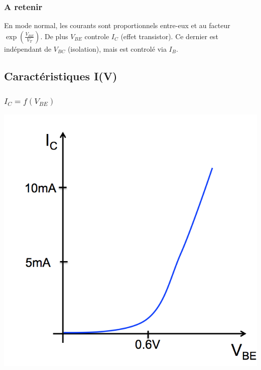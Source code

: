 \documentclass[]{article}
\begin{document}
\subsubsection{A retenir}
En mode normal, les courants sont proportionnels entre-eux et au facteur $\exp{(\frac{V_{BE}}{V_T})}$. De plus $V_{BE}$ controle $I_C$ (effet transistor). Ce dernier est indépendant de $V_{BC}$ (isolation), mais est controlé via $I_B$.

\subsection{Caractéristiques I(V)}
\subsubsection{$I_C = f(V_{BE})$}
\includegraphics[scale=0.4]{Ic_Vbe.png}
\end{document}

